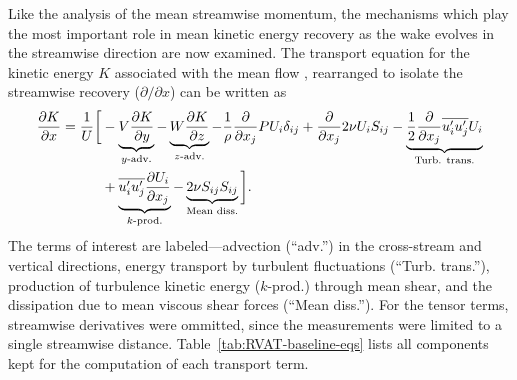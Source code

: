Like the analysis of the mean streamwise momentum, the mechanisms which play the
most important role in mean kinetic energy recovery as the wake evolves in the
streamwise direction are now examined. The transport equation for the kinetic
energy $K$ associated with the mean flow \cite{TennekesAndLumley}, rearranged to
isolate the streamwise recovery ($\partial / \partial x$) can be written as
\begin{equation}
    \begin{split}
        \frac{\partial K}{\partial x}
        =
        \frac{1}{U}
        \bigg{[}
        & - \underbrace{V \frac{\partial K}{\partial y}}_{y\text{-adv.}}
        - \underbrace{W \frac{\partial K}{\partial z}}_{z\text{-adv.}}
        - \frac{1}{\rho}\frac{\partial}{\partial x_j} P U_i \delta_{ij}
        + \frac{\partial}{\partial x_j} 2 \nu U_i S_{ij}
        - \underbrace{
            \frac{1}{2}\frac{\partial}{\partial x_j} \overline{u_i' u_j'} U_i
        }_{\text{Turb. trans.}} \\
        & + 
        \underbrace{
            \overline{u_i' u_j'} \frac{\partial U_i}{\partial x_j}
        }_{k\text{-prod.}}
        - 
        \underbrace{
            2 \nu S_{ij}S_{ij}
        }_{\text{Mean diss.}}
        \bigg{]}.
    \label{eq:K-full}
    \end{split}
\end{equation}
The terms of interest are labeled---advection (``adv.'') in the cross-stream and
vertical directions, energy transport by turbulent fluctuations (``Turb.
trans.''), production of turbulence kinetic energy ($k$-prod.) through mean
shear, and the dissipation due to mean viscous shear forces (``Mean diss.'').
For the tensor terms, streamwise derivatives were ommitted, since the
measurements were limited to a single streamwise distance.
Table~\ref{tab:RVAT-baseline-eqs} lists all components kept for the computation
of each transport term.


